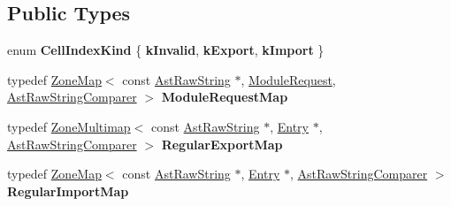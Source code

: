 \subsection*{Public Types}
\begin{DoxyCompactItemize}
\item 
\mbox{\label{classv8_1_1internal_1_1ModuleDescriptor_a66cdeaa292a82e29de05c3673d7a7c20}} 
enum {\bfseries Cell\+Index\+Kind} \{ {\bfseries k\+Invalid}, 
{\bfseries k\+Export}, 
{\bfseries k\+Import}
 \}
\item 
\mbox{\label{classv8_1_1internal_1_1ModuleDescriptor_a53d5dc46a3e92d58b67979b7d1b73732}} 
typedef \mbox{\hyperlink{classv8_1_1internal_1_1ZoneMap}{Zone\+Map}}$<$ const \mbox{\hyperlink{classv8_1_1internal_1_1AstRawString}{Ast\+Raw\+String}} $\ast$, \mbox{\hyperlink{structv8_1_1internal_1_1ModuleDescriptor_1_1ModuleRequest}{Module\+Request}}, \mbox{\hyperlink{structv8_1_1internal_1_1ModuleDescriptor_1_1AstRawStringComparer}{Ast\+Raw\+String\+Comparer}} $>$ {\bfseries Module\+Request\+Map}
\item 
\mbox{\label{classv8_1_1internal_1_1ModuleDescriptor_ae122bcdff1ec39ccc1b62b3267eec5db}} 
typedef \mbox{\hyperlink{classv8_1_1internal_1_1ZoneMultimap}{Zone\+Multimap}}$<$ const \mbox{\hyperlink{classv8_1_1internal_1_1AstRawString}{Ast\+Raw\+String}} $\ast$, \mbox{\hyperlink{structv8_1_1internal_1_1ModuleDescriptor_1_1Entry}{Entry}} $\ast$, \mbox{\hyperlink{structv8_1_1internal_1_1ModuleDescriptor_1_1AstRawStringComparer}{Ast\+Raw\+String\+Comparer}} $>$ {\bfseries Regular\+Export\+Map}
\item 
\mbox{\label{classv8_1_1internal_1_1ModuleDescriptor_aafe010635d4b67de7c74b2011a1c6d1f}} 
typedef \mbox{\hyperlink{classv8_1_1internal_1_1ZoneMap}{Zone\+Map}}$<$ const \mbox{\hyperlink{classv8_1_1internal_1_1AstRawString}{Ast\+Raw\+String}} $\ast$, \mbox{\hyperlink{structv8_1_1internal_1_1ModuleDescriptor_1_1Entry}{Entry}} $\ast$, \mbox{\hyperlink{structv8_1_1internal_1_1ModuleDescriptor_1_1AstRawStringComparer}{Ast\+Raw\+String\+Comparer}} $>$ {\bfseries Regular\+Import\+Map}
\end{DoxyCompactItemize}
